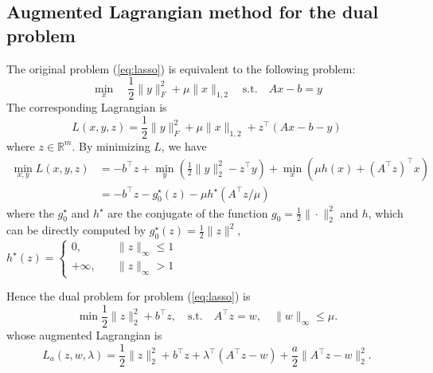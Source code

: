 \documentclass{article}
\numberwithin{equation}{section}
\numberwithin{figure}{section}
\begin{document}
\subsection{Augmented Lagrangian method for the dual problem}
The original problem (\ref{eq:lasso}) is equivalent to the following problem:
\begin{equation}
    \min_x\quad \frac{1}{2}\|y\|_F^2+\mu \|x\|_{1,2}\quad \mathrm{s.t.}\quad Ax-b = y
\end{equation}
The corresponding Lagrangian is
\begin{equation}
    L(x,y,z) = \frac{1}{2}\|y\|_F^2+\mu \|x\|_{1,2} +z^\top(Ax-b-y)
\end{equation}
where $z\in \mathbb{R}^m$.
By minimizing $L$, we have
\begin{equation}
\begin{split}
        \min_{x,y}L(x,y,z) &= -b^\top z+\min_y(\frac{1}{2}\|y\|_2^2-z^\top y)+\min_x(\mu h(x)+(A^\top z)^\top x)\\
        &= -b^\top z-g_0^\star(z)-\mu h^\star(A^\top z/\mu)
\end{split}
\end{equation}
where the $g_0^\star$ and $h^\star$ are the conjugate of the function $g_0=\frac{1}{2}\|\cdot\|_2^2$ and $h$, which can be directly computed by $g_0^\star(z) = \frac{1}{2}\|z\|^2$, $h^\star(z)=\begin{cases}0,\quad & \|z\|_\infty\leq 1\\ +\infty,\quad &\|z\|_\infty> 1\end{cases}$

Hence the dual problem for problem (\ref{eq:lasso}) is
\begin{equation}
    \min \frac{1}{2}\|z\|_2^2+b^\top z,\quad \mathrm{s.t.}\quad A^\top z=w,\quad \|w\|_\infty\leq \mu.
\end{equation}
whose augmented Lagrangian is
\begin{equation}
\label{eq:dualaugLag}
    L_a(z,w,\lambda)=\frac{1}{2}\|z\|_2^2+b^\top z+\lambda^\top(A^\top z-w)+\frac{a}{2}\|A^\top z-w\|_2^2.
\end{equation}
\end{document}
